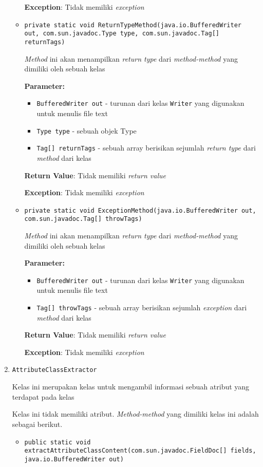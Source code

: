 \begin{enumerate}
\begin{itemize}
\textbf{Exception}: Tidak memiliki \textit{exception}

\item \texttt{private static void ReturnTypeMethod(java.io.BufferedWriter out, com.sun.javadoc.Type type, com.sun.javadoc.Tag[] returnTags)}

\textit{Method} ini akan menampilkan \textit{return type} dari \textit{method-method} yang dimiliki
 oleh sebuah kelas

\textbf{Parameter:}
\begin{itemize}
\item \texttt{BufferedWriter out} - 
turunan dari kelas \texttt{Writer} yang digunakan untuk menulis file text
\item \texttt{Type type} - 
sebuah objek Type
\item \texttt{Tag[] returnTags} - 
sebuah array berisikan sejumlah \textit{return type} dari \textit{method} dari kelas
\end{itemize}
\textbf{Return Value}: Tidak memiliki \textit{return value}

\textbf{Exception}: Tidak memiliki \textit{exception}

\item \texttt{private static void ExceptionMethod(java.io.BufferedWriter out, com.sun.javadoc.Tag[] throwTags)}

\textit{Method} ini akan menampilkan \textit{return type} dari \textit{method-method} yang dimiliki
 oleh sebuah kelas

\textbf{Parameter:}
\begin{itemize}
\item \texttt{BufferedWriter out} - 
turunan dari kelas \texttt{Writer} yang digunakan untuk menulis file text
\item \texttt{Tag[] throwTags} - 
sebuah array berisikan sejumlah \textit{exception} dari \textit{method} dari kelas
\end{itemize}
\textbf{Return Value}: Tidak memiliki \textit{return value}

\textbf{Exception}: Tidak memiliki \textit{exception}

\end{itemize}
\item \texttt{AttributeClassExtractor}

Kelas ini merupakan kelas untuk mengambil informasi sebuah atribut yang
 terdapat pada kelas

Kelas ini tidak memiliki atribut. \textit{Method-method} yang dimiliki kelas ini adalah sebagai berikut.
\begin{itemize}
\item \texttt{public static void extractAttributeClassContent(com.sun.javadoc.FieldDoc[] fields, java.io.BufferedWriter out)}


\end{itemize}
\end{enumerate}
